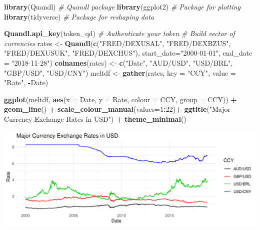 \documentclass[]{article}
\newenvironment{Shaded}{\begin{snugshade}}{\end{snugshade}}
\newcommand{\CommentTok}[1]{\textcolor[rgb]{0.56,0.35,0.01}{\textit{#1}}}
\newcommand{\DataTypeTok}[1]{\textcolor[rgb]{0.13,0.29,0.53}{#1}}
\newcommand{\DecValTok}[1]{\textcolor[rgb]{0.00,0.00,0.81}{#1}}
\newcommand{\KeywordTok}[1]{\textcolor[rgb]{0.13,0.29,0.53}{\textbf{#1}}}
\newcommand{\NormalTok}[1]{#1}
\newcommand{\OperatorTok}[1]{\textcolor[rgb]{0.81,0.36,0.00}{\textbf{#1}}}
\newcommand{\StringTok}[1]{\textcolor[rgb]{0.31,0.60,0.02}{#1}}
\begin{document}
\begin{Shaded}
\begin{Highlighting}[]
\KeywordTok{library}\NormalTok{(Quandl)                 }\CommentTok{# Quandl package}
\KeywordTok{library}\NormalTok{(ggplot2)                }\CommentTok{# Package for plotting}
\KeywordTok{library}\NormalTok{(tidyverse)              }\CommentTok{# Package for reshaping data}

\KeywordTok{Quandl.api_key}\NormalTok{(token_qd)                }\CommentTok{# Authenticate your token}
\CommentTok{# Build vector of currencies}
\NormalTok{rates <-}\StringTok{ }\KeywordTok{Quandl}\NormalTok{(}\KeywordTok{c}\NormalTok{(}\StringTok{"FRED/DEXUSAL"}\NormalTok{, }\StringTok{"FRED/DEXBZUS"}\NormalTok{, }\StringTok{"FRED/DEXUSUK"}\NormalTok{, }\StringTok{"FRED/DEXCHUS"}\NormalTok{),}
                \DataTypeTok{start_date=}\StringTok{"2000-01-01"}\NormalTok{,}
                \DataTypeTok{end_date =} \StringTok{"2018-11-28"}\NormalTok{)}
\KeywordTok{colnames}\NormalTok{(rates) <-}\StringTok{ }\KeywordTok{c}\NormalTok{(}\StringTok{"Date"}\NormalTok{, }\StringTok{"AUD/USD"}\NormalTok{, }\StringTok{"USD/BRL"}\NormalTok{, }\StringTok{"GBP/USD"}\NormalTok{, }\StringTok{"USD/CNY"}\NormalTok{)}
\NormalTok{meltdf <-}\StringTok{ }\KeywordTok{gather}\NormalTok{(rates, }\DataTypeTok{key =} \StringTok{"CCY"}\NormalTok{, }\DataTypeTok{value =} \StringTok{"Rate"}\NormalTok{, }\OperatorTok{-}\NormalTok{Date)}

\KeywordTok{ggplot}\NormalTok{(meltdf, }\KeywordTok{aes}\NormalTok{(}\DataTypeTok{x =}\NormalTok{ Date, }\DataTypeTok{y =}\NormalTok{ Rate, }\DataTypeTok{colour =}\NormalTok{ CCY, }\DataTypeTok{group =}\NormalTok{ CCY)) }\OperatorTok{+}
\StringTok{  }\KeywordTok{geom_line}\NormalTok{() }\OperatorTok{+}
\StringTok{  }\KeywordTok{scale_colour_manual}\NormalTok{(}\DataTypeTok{values=}\DecValTok{1}\OperatorTok{:}\DecValTok{22}\NormalTok{)}\OperatorTok{+}
\StringTok{  }\KeywordTok{ggtitle}\NormalTok{(}\StringTok{"Major Currency Exchange Rates in USD"}\NormalTok{) }\OperatorTok{+}
\StringTok{  }\KeywordTok{theme_minimal}\NormalTok{()}
\end{Highlighting}
\end{Shaded}

\begin{center}\includegraphics{lec13_files/figure-latex/unnamed-chunk-11-1} \end{center}
\end{document}
